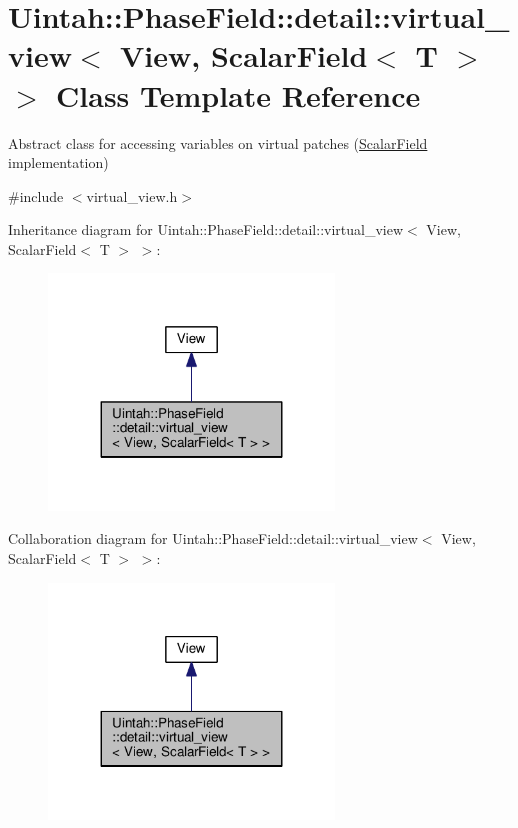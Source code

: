 \hypertarget{classUintah_1_1PhaseField_1_1detail_1_1virtual__view_3_01View_00_01ScalarField_3_01T_01_4_01_4}{}\section{Uintah\+:\+:Phase\+Field\+:\+:detail\+:\+:virtual\+\_\+view$<$ View, Scalar\+Field$<$ T $>$ $>$ Class Template Reference}
\label{classUintah_1_1PhaseField_1_1detail_1_1virtual__view_3_01View_00_01ScalarField_3_01T_01_4_01_4}


Abstract class for accessing variables on virtual patches (\hyperlink{structUintah_1_1PhaseField_1_1ScalarField}{Scalar\+Field} implementation)  




{\ttfamily \#include $<$virtual\+\_\+view.\+h$>$}



Inheritance diagram for Uintah\+:\+:Phase\+Field\+:\+:detail\+:\+:virtual\+\_\+view$<$ View, Scalar\+Field$<$ T $>$ $>$\+:\nopagebreak
\begin{figure}[H]
\begin{center}
\leavevmode
\includegraphics[width=215pt]{classUintah_1_1PhaseField_1_1detail_1_1virtual__view_3_01View_00_01ScalarField_3_01T_01_4_01_4__inherit__graph}
\end{center}
\end{figure}


Collaboration diagram for Uintah\+:\+:Phase\+Field\+:\+:detail\+:\+:virtual\+\_\+view$<$ View, Scalar\+Field$<$ T $>$ $>$\+:\nopagebreak
\begin{figure}[H]
\begin{center}
\leavevmode
\includegraphics[width=215pt]{classUintah_1_1PhaseField_1_1detail_1_1virtual__view_3_01View_00_01ScalarField_3_01T_01_4_01_4__coll__graph}
\end{center}
\end{figure}
